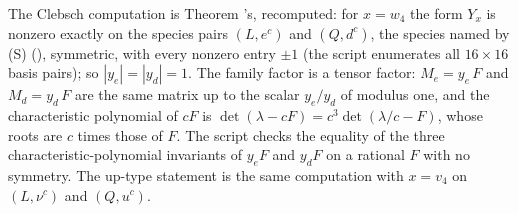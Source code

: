 The Clebsch computation is Theorem 's, recomputed: for $x = w_{4}$ the form $Y_{x}$ is nonzero exactly on the species pairs $(L, e^{c})$ and $(Q, d^{c})$, the species named by (S) (), symmetric, with every nonzero entry $\pm 1$ (the script enumerates all $16 \times 16$ basis pairs); so $|y_{e}| = |y_{d}| = 1$. The family factor is a tensor factor: $M_{e} = y_{e}\,F$ and $M_{d} = y_{d}\,F$ are the same matrix up to the scalar $y_{e}/y_{d}$ of modulus one, and the characteristic polynomial of $cF$ is $\det(\lambda - cF) = c^{3}\det(\lambda/c - F)$, whose roots are $c$ times those of $F$. The script checks the equality of the three characteristic-polynomial invariants of $y_{e}F$ and $y_{d}F$ on a rational $F$ with no symmetry. The up-type statement is the same computation with $x = v_{4}$ on $(L, \nu^{c})$ and $(Q, u^{c})$.
